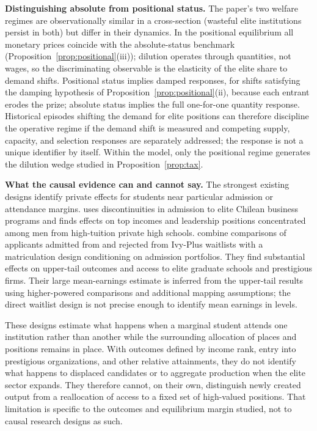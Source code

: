 \documentclass[12pt,letterpaper]{article}
\theoremstyle{definition}
\begin{document}
\textbf{Distinguishing absolute from positional status.}
The paper's two welfare regimes are observationally similar in a cross-section (wasteful elite institutions persist in both) but differ in their dynamics.
In the positional equilibrium all monetary prices coincide with the absolute-status benchmark (Proposition~\ref{prop:positional}(iii)); dilution operates through quantities, not wages, so the discriminating observable is the elasticity of the elite share to demand shifts.
Positional status implies damped responses, for shifts satisfying the damping hypothesis of Proposition~\ref{prop:positional}(ii), because each entrant erodes the prize; absolute status implies the full one-for-one quantity response.
Historical episodes shifting the demand for elite positions can therefore discipline the operative regime if the demand shift is measured and competing supply, capacity, and selection responses are separately addressed; the response is not a unique identifier by itself.
Within the model, only the positional regime generates the dilution wedge studied in Proposition~\ref{prop:tax}.

\textbf{What the causal evidence can and cannot say.}
The strongest existing designs identify private effects for students near particular admission or attendance margins.
\citet{zimmerman2019elite} uses discontinuities in admission to elite Chilean business programs and finds effects on top incomes and leadership positions concentrated among men from high-tuition private high schools.
\citet{chettydemingfriedman2026} combine comparisons of applicants admitted from and rejected from Ivy-Plus waitlists with a matriculation design conditioning on admission portfolios.
They find substantial effects on upper-tail outcomes and access to elite graduate schools and prestigious firms.
Their large mean-earnings estimate is inferred from the upper-tail results using higher-powered comparisons and additional mapping assumptions; the direct waitlist design is not precise enough to identify mean earnings in levels.

These designs estimate what happens when a marginal student attends one institution rather than another while the surrounding allocation of places and positions remains in place.
With outcomes defined by income rank, entry into prestigious organizations, and other relative attainments, they do not identify what happens to displaced candidates or to aggregate production when the elite sector expands.
They therefore cannot, on their own, distinguish newly created output from a reallocation of access to a fixed set of high-valued positions.
That limitation is specific to the outcomes and equilibrium margin studied, not to causal research designs as such.
\end{document}

